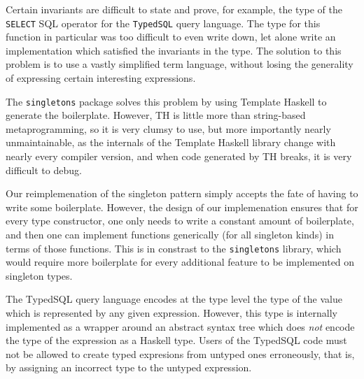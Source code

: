 \begin{description}[leftmargin=1em]

\item[Exceeding complex type level invariants] Certain invariants are difficult to state and prove,
  for example, the type of the \texttt{SELECT} SQL operator for the \texttt{TypedSQL}
  query language. The type for this function in particular was too difficult to even 
  write down, let alone write an implementation which satisfied the invariants 
  in the type. The solution to this problem is to use a vastly simplified term language,
  without losing the generality of expressing certain interesting expressions. 

\item[Singletons have a lot of boilerplate code] The \texttt{singletons}
  package solves this problem by using Template Haskell to generate the
  boilerplate. However, TH is little more than string-based metaprogramming,
  so it is very clumsy to use, but more importantly nearly unmaintainable,
  as the internals of the Template Haskell library change with nearly every
  compiler version, and when code generated by TH breaks, it is very difficult
  to debug. 

  Our reimplemenation of the singleton pattern simply accepts the fate of 
  having to write some boilerplate. However, the design of our implemenation 
  ensures that for every type constructor, one only needs to write a constant 
  amount of boilerplate, and then one can implement functions generically (for 
  all singleton kinds) in terms of those functions. This is in constrast 
  to the \texttt{singletons} library, which would require more boilerplate 
  for every additional feature to be implemented on singleton types. 

\item[Defining a typed term language from an untyped one]
  The TypedSQL query language encodes at the type level the type of the 
  value which is represented by any given expression. However, this
  type is internally implemented as a wrapper around an abstract syntax
  tree which does \emph{not} encode the type of the expression as a Haskell
  type. Users of the TypedSQL code must not be allowed to create typed
  expresions from untyped ones erroneously, that is, by assigning an incorrect
  type to the untyped expression. 
  

\end{description}
